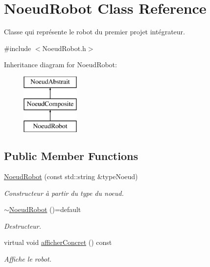 \hypertarget{class_noeud_robot}{}\section{Noeud\+Robot Class Reference}
\label{class_noeud_robot}


Classe qui représente le robot du premier projet intégrateur.  




{\ttfamily \#include $<$Noeud\+Robot.\+h$>$}

Inheritance diagram for Noeud\+Robot\+:\begin{figure}[H]
\begin{center}
\leavevmode
\includegraphics[height=3.000000cm]{class_noeud_robot}
\end{center}
\end{figure}
\subsection*{Public Member Functions}
\begin{DoxyCompactItemize}
\item 
\hyperlink{group__inf2990_ga147453ac7f72970d7d9bfe336998ad94}{Noeud\+Robot} (const std\+::string \&type\+Noeud)
\begin{DoxyCompactList}\small\item\em Constructeur à partir du type du noeud. \end{DoxyCompactList}\item 
\hypertarget{class_noeud_robot_a463e2ae1e6b69577057efa310b0f6cd2}{}\hyperlink{class_noeud_robot_a463e2ae1e6b69577057efa310b0f6cd2}{$\sim$\+Noeud\+Robot} ()=default\label{class_noeud_robot_a463e2ae1e6b69577057efa310b0f6cd2}

\begin{DoxyCompactList}\small\item\em Destructeur. \end{DoxyCompactList}\item 
virtual void \hyperlink{group__inf2990_gad63a8e09cc5ca8cc349f35e0901474e2}{afficher\+Concret} () const 
\begin{DoxyCompactList}\small\item\em Affiche le robot. \end{DoxyCompactList}\end{DoxyCompactItemize}
